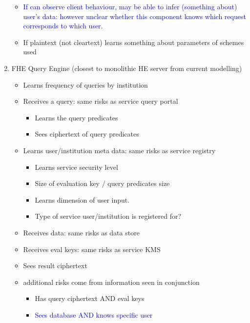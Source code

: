 \begin{enumerate}
          \begin{itemize}
              \item \textcolor{blue}{If can observe client behaviour, may be able to infer (something about) user’s data: however unclear whether this component knows which request corresponds to which user.}
              \item If plaintext (not cleartext) learns something about parameters of schemes used
          \end{itemize}
    \item FHE Query Engine (closest to monolithic HE server from current modelling)
          \begin{itemize}
              \item Learns frequency of queries by institution
              \item Receives a query: same risks as service query portal
                    \begin{itemize}
                        \item Learns the query predicates
                        \item Sees ciphertext of query predicates
                    \end{itemize}
              \item Learns user/institution meta data: same risks as service registry
                    \begin{itemize}
                        \item Learns service security level
                        \item Size of evaluation key / query predicates size
                        \item Learns dimension of user input.
                        \item Type of service user/institution is registered for?
                    \end{itemize}
              \item Receives data: same risks as data store
              \item Receives eval keys: same risks as service KMS
              \item Sees result ciphertext
              \item additional risks come from information seen in conjunction
                    \begin{itemize}
                        \item Has query ciphertext AND eval keys
                        \item \textcolor{blue}{Sees database AND knows specific user}

\end{itemize}
\end{itemize}
\end{enumerate}
